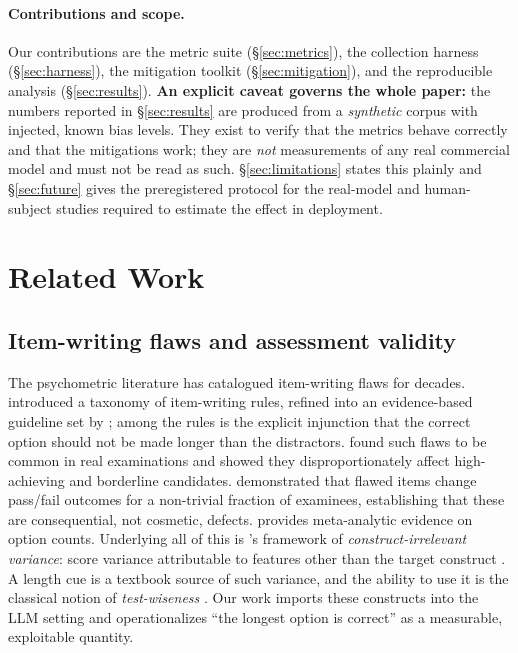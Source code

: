 \documentclass[10pt,twocolumn]{article}
\begin{document}
\paragraph{Contributions and scope.} Our contributions are the metric suite
(\S\ref{sec:metrics}), the collection harness (\S\ref{sec:harness}), the
mitigation toolkit (\S\ref{sec:mitigation}), and the reproducible analysis
(\S\ref{sec:results}). \textbf{An explicit caveat governs the whole paper:}
the numbers reported in \S\ref{sec:results} are produced from a
\emph{synthetic} corpus with injected, known bias levels. They exist to
verify that the metrics behave correctly and that the mitigations work; they
are \emph{not} measurements of any real commercial model and must not be read
as such. \S\ref{sec:limitations} states this plainly and
\S\ref{sec:future} gives the preregistered protocol for the real-model and
human-subject studies required to estimate the effect in deployment.

\section{Related Work}
\label{sec:related}

\subsection{Item-writing flaws and assessment validity}
The psychometric literature has catalogued item-writing flaws for decades.
\citet{haladyna1989taxonomy} introduced a taxonomy of item-writing rules,
refined into an evidence-based guideline set by \citet{haladyna2002review};
among the rules is the explicit injunction that the correct option should not
be made longer than the distractors. \citet{tarrant2006frequency} found such
flaws to be common in real examinations and showed they disproportionately
affect high-achieving and borderline candidates. \citet{downing2005effects}
demonstrated that flawed items change pass/fail outcomes for a non-trivial
fraction of examinees, establishing that these are consequential, not cosmetic,
defects. \citet{rodriguez2005three} provides meta-analytic evidence on option
counts. Underlying all of this is \citeauthor{messick1989validity}'s framework
of \emph{construct-irrelevant variance}: score variance attributable to
features other than the target construct \citep{messick1989validity}. A
length cue is a textbook source of such variance, and the ability to use it is
the classical notion of \emph{test-wiseness}
\citep{millman1965testwiseness}. Our work imports these constructs into the
LLM setting and operationalizes ``the longest option is correct'' as a
measurable, exploitable quantity.
\end{document}
